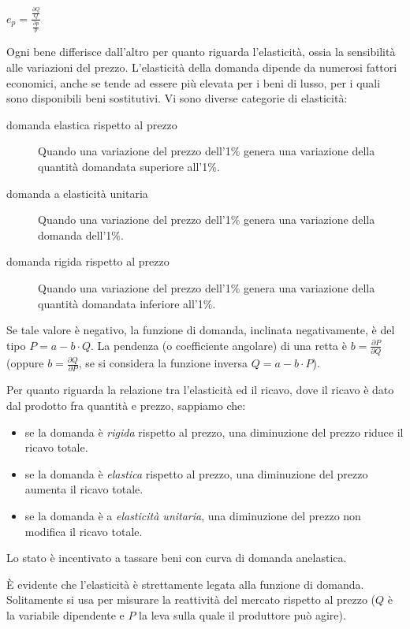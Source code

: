 \( e_p = \frac {\frac {\partial Q} {Q} } { \frac {\partial p} {p}}\)

Ogni bene differisce dall'altro per quanto riguarda l'elasticità, ossia la 
sensibilità alle variazioni del prezzo. L'elasticità della domanda dipende da 
numerosi fattori economici, anche se tende ad essere più elevata per i beni di 
lusso, per i quali sono disponibili beni sostitutivi. Vi sono diverse categorie 
di elasticità:

\begin{description}
 \item [domanda elastica rispetto al prezzo]
Quando una variazione del prezzo dell'1\% genera una variazione della 
quantità domandata superiore all'1\%.
 \item [domanda a elasticità unitaria]
Quando una variazione del prezzo dell'1\% genera una variazione della 
domanda dell'1\%.
 \item [domanda rigida rispetto al prezzo]
Quando una variazione del prezzo dell'1\% genera una variazione della 
quantità domandata inferiore all'1\%.
\end{description}

Se tale valore è negativo, la funzione di domanda, 
inclinata negativamente, è del tipo \(P = a -b \cdot Q\). La pendenza 
(o coefficiente angolare) di una retta è \(b = \frac {\partial P} {\partial Q}\) 
(oppure \(b = \frac {\partial Q} {\partial P}\), se 
si considera la funzione inversa \(Q = a - b \cdot P\)).

Per quanto riguarda la relazione tra l'elasticità ed il ricavo, dove il ricavo 
è dato dal prodotto fra quantità e prezzo, sappiamo che:
\begin{itemize}
 \item se la domanda è \emph{rigida} rispetto al prezzo, una diminuzione del 
prezzo riduce il ricavo totale.
 \item se la domanda è \emph{elastica} rispetto al prezzo, una diminuzione 
del prezzo aumenta il ricavo totale.
 \item se la domanda è a \emph{elasticità unitaria}, una diminuzione del 
prezzo non modifica il ricavo totale.
\end{itemize}

Lo stato è incentivato a tassare beni con curva di domanda anelastica.

È evidente che l'elasticità è strettamente legata alla funzione di domanda. 
Solitamente si usa per misurare la reattività del mercato rispetto al prezzo 
(\(Q\) è la variabile dipendente e \(P\) la leva sulla quale 
il produttore può agire).

